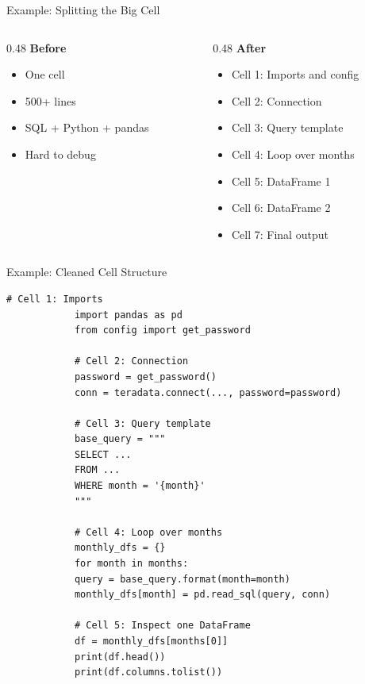 \documentclass[aspectratio=169,11pt]{beamer}
\begin{document}
	\begin{frame}{Example: Splitting the Big Cell}
		\begin{columns}[T]
			\begin{column}{0.48\textwidth}
				\textbf{Before}
				\begin{itemize}
					\item One cell
					\item 500+ lines
					\item SQL + Python + pandas
					\item Hard to debug
				\end{itemize}
			\end{column}
			\begin{column}{0.48\textwidth}
				\textbf{After}
				\begin{itemize}
					\item Cell 1: Imports and config
					\item Cell 2: Connection
					\item Cell 3: Query template
					\item Cell 4: Loop over months
					\item Cell 5: DataFrame 1
					\item Cell 6: DataFrame 2
					\item Cell 7: Final output
				\end{itemize}
			\end{column}
		\end{columns}
	\end{frame}
	
	\begin{frame}[fragile]{Example: Cleaned Cell Structure}
		\begin{lstlisting}[caption={Split cells (conceptual)}]
			# Cell 1: Imports
			import pandas as pd
			from config import get_password
			
			# Cell 2: Connection
			password = get_password()
			conn = teradata.connect(..., password=password)
			
			# Cell 3: Query template
			base_query = """
			SELECT ...
			FROM ...
			WHERE month = '{month}'
			"""
			
			# Cell 4: Loop over months
			monthly_dfs = {}
			for month in months:
			query = base_query.format(month=month)
			monthly_dfs[month] = pd.read_sql(query, conn)
			
			# Cell 5: Inspect one DataFrame
			df = monthly_dfs[months[0]]
			print(df.head())
			print(df.columns.tolist())
		\end{lstlisting}
	\end{frame}
	
\end{document}
